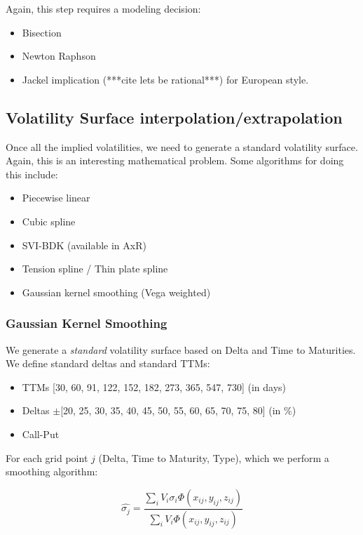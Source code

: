 \documentclass[11pt,confidential]{article}
\begin{document}
Again, this step requires a modeling decision:

\begin{itemize}
\item Bisection
\item Newton Raphson 
\item Jackel implication (***cite lets be rational***) for European style.
\end{itemize}

\subsection{Volatility Surface interpolation/extrapolation}

Once all the implied volatilities, we need to generate a standard volatility surface. Again, this is an interesting mathematical problem. Some algorithms for doing this include:

\begin{itemize}
\item Piecewise linear
\item Cubic spline
\item SVI-BDK (available in AxR)
\item Tension spline / Thin plate spline
\item Gaussian kernel smoothing (Vega weighted)
\end{itemize}



\subsubsection{Gaussian Kernel Smoothing}

We generate a \textit{standard} volatility surface based on Delta and Time to Maturities. 
We define standard deltas and standard TTMs:
\begin{itemize}
\item TTMs [30, 60, 91, 122, 152, 182, 273, 365, 547, 730] (in days)
\item Deltas $\pm$[20, 25, 30, 35, 40, 45, 50, 55, 60, 65, 70, 75, 80] (in \%)
\item Call-Put
\end{itemize}

For each grid point $j$ (Delta, Time to Maturity, Type), which we perform a smoothing algorithm: 

\[\hat{\sigma_j}=\frac{\sum_i V_i\sigma_i\Phi(x_{ij},y_{ij},z_{ij})}{\sum_i V_i\Phi(x_{ij},y_{ij},z_{ij})}\]
\end{document}

